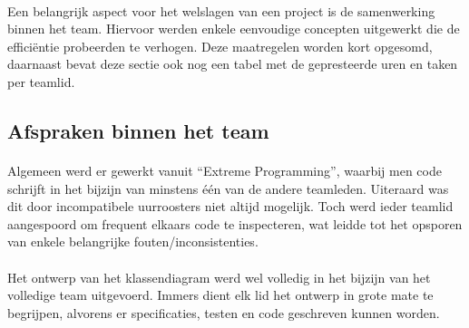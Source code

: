 \label{projectbeheer}
\paragraph{}
Een belangrijk aspect voor het welslagen van een project is de samenwerking binnen het team. Hiervoor werden enkele eenvoudige concepten uitgewerkt die de effici\"entie probeerden te verhogen. Deze maatregelen worden kort opgesomd, daarnaast bevat deze sectie ook nog een tabel met de gepresteerde uren en taken per teamlid.
\subsection{Afspraken binnen het team}
\paragraph{}
Algemeen werd er gewerkt vanuit ``Extreme Programming'', waarbij men code schrijft in het bijzijn van minstens \'e\'en van de andere teamleden. Uiteraard was dit door incompatibele uurroosters niet altijd mogelijk. Toch werd ieder teamlid aangespoord om frequent elkaars code te inspecteren, wat leidde tot het opsporen van enkele belangrijke fouten/inconsistenties.
\paragraph{}
Het ontwerp van het klassendiagram werd wel volledig in het bijzijn van het volledige team uitgevoerd. Immers dient elk lid het ontwerp in grote mate te begrijpen, alvorens er specificaties, testen en code geschreven kunnen worden.
